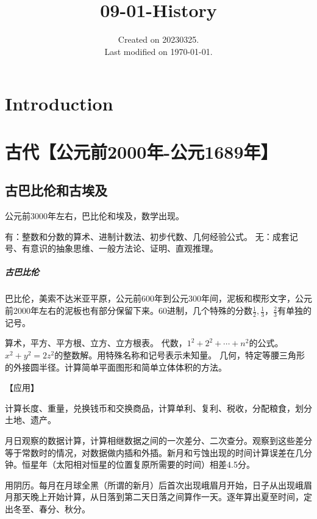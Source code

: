 \documentclass[UTF8]{../09-Mathematics}
\begin{document}
\title{09-01-History}
\date{Created on 20230325.\\   Last modified on \today.}
\maketitle
\tableofcontents


\chapter{Introduction}




\chapter{古代【公元前2000年-公元1689年】}


\section{古巴比伦和古埃及}

公元前3000年左右，巴比伦和埃及，数学出现。

有：整数和分数的算术、进制计数法、初步代数、几何经验公式。
无：成套记号、有意识的抽象思维、一般方法论、证明、直观推理。


\paragraph{古巴比伦}

巴比伦，美索不达米亚平原，公元前600年到公元300年间，泥板和楔形文字，公元前2000年左右的泥板也有部分保留下来。60进制，几个特殊的分数$\frac{1}{2},\frac{1}{3}，\frac{2}{3}$有单独的记号。

算术，平方、平方根、立方、立方根表。
代数，$1^2 + 2^2 + \cdots + n^2$的公式。$x^2 + y^2 = 2z^2$的整数解。用特殊名称和记号表示未知量。
几何，特定等腰三角形的外接圆半径。计算简单平面图形和简单立体体积的方法。

【应用】

计算长度、重量，兑换钱币和交换商品，计算单利、复利、税收，分配粮食，划分土地、遗产。

月日观察的数据计算，计算相继数据之间的一次差分、二次查分。观察到这些差分等于常数时的情况，对数据做内插和外插。新月和亏蚀出现的时间计算误差在几分钟。恒星年（太阳相对恒星的位置复原所需要的时间）相差4.5分。

用阴历。每月在月球全黑（所谓的新月）后首次出现峨眉月开始，日子从出现峨眉月那天晚上开始计算，从日落到第二天日落之间算作一天。逐年算出夏至时间，定出冬至、春分、秋分。
\end{document}
